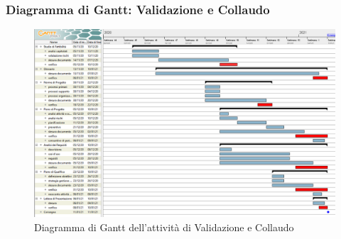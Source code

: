 \subsubsection{Diagramma di Gantt: Validazione e Collaudo}
\begin{figure}[h]
	\includegraphics[scale=0.45]{Images/GanttPianificazioneAnalisi.PNG}
	\caption{Diagramma di Gantt dell'attività di Validazione e Collaudo}
\end{figure}